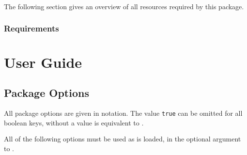 \documentclass{ltxdockit}
\begin{document}
The following section gives an overview of all resources required by this package.

\subsubsection{Requirements}
\label{sec:intro:req}

\section{User Guide}
\label{sec:userguide}

\subsection{Package Options}
\label{sec:userguide:pkgopt}

All package options are given in \keyval notation.
The value \texttt{true} can be omitted for all boolean keys, \eg {} without a value is equivalent to .

All of the following options must be used as  is loaded, \ie in the optional argument to .
\end{document}
